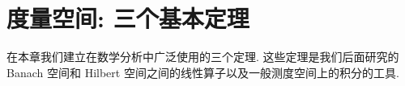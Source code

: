 \documentclass[../main.tex]{subfiles}
\begin{document}
\chapter{度量空间: 三个基本定理}\label{chapter:ch10-度量空间三个基本定理}

在本章我们建立在数学分析中广泛使用的三个定理. 这些定理是我们后面研究的 Banach 空间和 Hilbert 空间之间的线性算子以及一般测度空间上的积分的工具.






\end{document}
